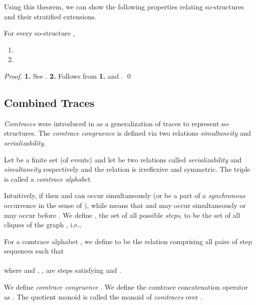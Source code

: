 \documentclass{llncs}
\begin{document}
Using this theorem, we can show the following properties relating so-structures and their stratified extensions.
\begin{corollary}
For every so-structure ,
\begin{enumerate}
 \item 
 \item 
\end{enumerate}
\label{cor:SzpStrat}
\end{corollary}
\begin{proof}\textbf{1. } See \cite[Theorem 3.6]{JK97}. \textbf{2. } Follows from \textbf{1.} and . \qed


\end{proof}


\subsection{Combined Traces}

{\em Comtraces} were introduced in \cite{JK95} as a generalization of traces to represent so-structures. The \emph{comtrace congruence} is defined via two relations {\em simultaneity} and {\em serializability}.

\begin{definition} Let  be a finite set (of events) and let  be two relations called \emph{serializability} and \emph{simultaneity} respectively and the relation  is irreflexive and symmetric. The triple  is called a \emph{comtrace alphabet}. \EOD
\label{def:comalpha}
\end{definition}

Intuitively, if  then  and  can occur simultaneously
(or be a part of a {\em synchronous} occurrence in the sense of \cite{JLM06}),
while  means that  and  may occur simultaneously
or  may occur before . We define , the set of all possible {\em steps},
 to be the set of all cliques of
the graph , i.e.,\\


\begin{definition}
For a comtrace alphabet , we define  to be the relation comprising all pairs  of step sequences such that \smallskip\\
\smallskip\\
where  and , ,  are steps satisfying  and . 

We define \emph{comtrace congruence} . We define the comtrace concatenation operator  as . The quotient monoid  is called the monoid of {\em comtraces} over . \EOD
\label{def:commonoid}
\end{definition}
\end{document}
